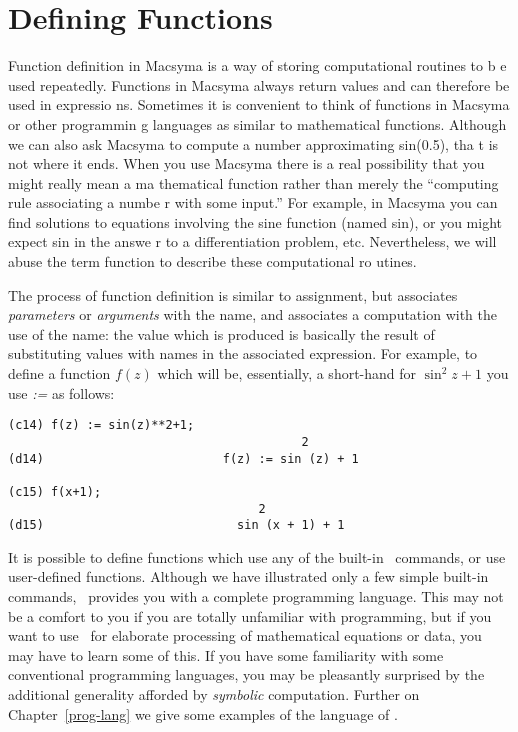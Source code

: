 \section{Defining Functions}
Function definition in Macsyma  is a way of storing computational routines to b
e used repeatedly.
Functions in Macsyma always return values and can therefore be used in expressio
ns.
Sometimes it is convenient to think of functions in Macsyma  or other programmin
g languages as similar to mathematical functions.
Although we can also ask Macsyma to compute a number approximating sin(0.5), tha
t is not where it ends.
When you use Macsyma there is a real possibility that you might really mean a ma
thematical function rather than merely  the ``computing rule associating a numbe
r with some input.'' For example, in Macsyma you can find solutions to equations
 involving the sine  function (named sin), or you might expect  sin in the answe
r to a differentiation problem, etc.
Nevertheless, we will abuse the term function to describe these computational ro
utines.

The process of function definition is similar to assignment, but associates
{\it parameters} or {\it arguments} with the name, and associates
a computation with the use of the name: the value which is produced is
basically the result of substituting values with names in
the associated expression.
For example,
to define a function $f ( z )$ which will be, essentially, a short-hand for
$\sin^2 z + 1 $ you use {\it :=} as follows:
\begin{verbatim}
(c14) f(z) := sin(z)**2+1;
                                         2
(d14)                         f(z) := sin (z) + 1

(c15) f(x+1);
                                   2
(d15)                           sin (x + 1) + 1
\end{verbatim}
It is possible to define functions which use any of
the built-in
\Max\
commands, or use user-defined functions.
Although we have illustrated only a few simple built-in commands,
\Max\
provides you with a
complete programming language. 
This may not be a comfort to you if you are totally unfamiliar with
programming, but if you want to use 
\Max\
for elaborate processing of mathematical equations or data,
you may have to learn some of this.  
If you have some familiarity with some conventional programming
languages, you may be pleasantly surprised by the additional
generality afforded by {\it symbolic} computation.
Further on Chapter~\ref{prog-lang}
we give some examples of the language of \Max.

